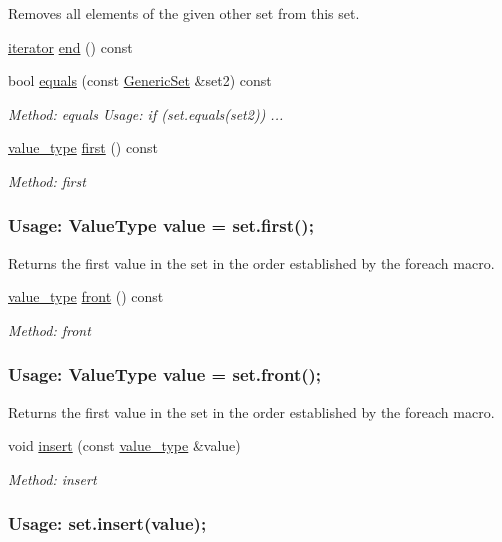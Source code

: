 \begin{DoxyCompactItemize}
\begin{DoxyCompactList}
Removes all elements of the given other set from this set. \end{DoxyCompactList}\item 
\mbox{\hyperlink{classstanfordcpplib_1_1collections_1_1GenericSet_ab3d10e70baaeac78e76b7abae7e2cf76}{iterator}} \mbox{\hyperlink{classstanfordcpplib_1_1collections_1_1GenericSet_a68b688a51bd0cf6fb5bc2cba292209a8}{end}} () const
\item 
bool \mbox{\hyperlink{classstanfordcpplib_1_1collections_1_1GenericSet_af0f6c12b7eb171e7b5e3725f04f3c1f3}{equals}} (const \mbox{\hyperlink{classstanfordcpplib_1_1collections_1_1GenericSet}{Generic\+Set}} \&set2) const
\begin{DoxyCompactList}\small\item\em Method\+: equals Usage\+: if (set.\+equals(set2)) ... \end{DoxyCompactList}\item 
\mbox{\hyperlink{classstanfordcpplib_1_1collections_1_1GenericSet_a669c81f158766925e7293f97c0099b28}{value\+\_\+type}} \mbox{\hyperlink{classstanfordcpplib_1_1collections_1_1GenericSet_a645a432ab2e8069945e37c3adc9a7ff5}{first}} () const
\begin{DoxyCompactList}\small\item\em Method\+: first \subsubsection*{Usage\+: Value\+Type value = set.\+first(); }

Returns the first value in the set in the order established by the {\ttfamily foreach} macro. \end{DoxyCompactList}\item 
\mbox{\hyperlink{classstanfordcpplib_1_1collections_1_1GenericSet_a669c81f158766925e7293f97c0099b28}{value\+\_\+type}} \mbox{\hyperlink{classstanfordcpplib_1_1collections_1_1GenericSet_a9c9f0cc6419ef7e036df4eeac4825b2c}{front}} () const
\begin{DoxyCompactList}\small\item\em Method\+: front \subsubsection*{Usage\+: Value\+Type value = set.\+front(); }

Returns the first value in the set in the order established by the {\ttfamily foreach} macro. \end{DoxyCompactList}\item 
void \mbox{\hyperlink{classstanfordcpplib_1_1collections_1_1GenericSet_aa81ff41776176f38b1a5c616f1815831}{insert}} (const \mbox{\hyperlink{classstanfordcpplib_1_1collections_1_1GenericSet_a669c81f158766925e7293f97c0099b28}{value\+\_\+type}} \&value)
\begin{DoxyCompactList}\small\item\em Method\+: insert \subsubsection*{Usage\+: set.\+insert(value); }


\end{DoxyCompactList}
\end{DoxyCompactItemize}
